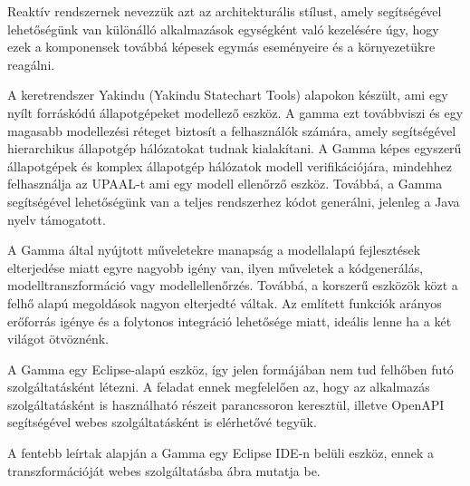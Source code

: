 Reaktív rendszernek nevezzük azt az architekturális stílust, amely segítségével lehetőségünk van különálló alkalmazások egységként való kezelésére úgy, hogy ezek a komponensek továbbá képesek egymás eseményeire és a környezetükre reagálni.

A keretrendszer Yakindu (Yakindu Statechart Tools) alapokon készült, ami egy nyílt forráskódú állapotgépeket modellező eszköz. A gamma ezt továbbviszi és egy magasabb modellezési réteget biztosít a felhasználók számára, amely segítségével hierarchikus állapotgép hálózatokat tudnak kialakítani. A Gamma képes egyszerű állapotgépek és komplex állapotgép hálózatok modell verifikációjára, mindehhez felhasználja az UPAAL-t ami egy modell ellenőrző eszköz. Továbbá, a Gamma segítségével lehetőségünk van a teljes rendszerhez kódot generálni, jelenleg a Java nyelv támogatott.


A Gamma által nyújtott műveletekre manapság a modellalapú fejlesztések elterjedése miatt egyre nagyobb igény van, ilyen műveletek a kódgenerálás, modelltranszformáció vagy modellellenőrzés. Továbbá, a korszerű eszközök közt a felhő alapú megoldások nagyon elterjedté váltak. Az említett funkciók arányos erőforrás igénye és a folytonos integráció lehetősége miatt, ideális lenne ha a két világot ötvöznénk.


A Gamma egy Eclipse-alapú eszköz, így jelen formájában nem tud felhőben futó szolgáltatásként létezni. A feladat ennek megfelelően az, hogy az alkalmazás szolgáltatásként is használható részeit parancssoron keresztül, illetve OpenAPI segítségével webes szolgáltatásként is elérhetővé tegyük.

A fentebb leírtak alapján a Gamma egy Eclipse IDE-n belüli eszköz, ennek a transzformációját webes szolgáltatásba  ábra mutatja be.


